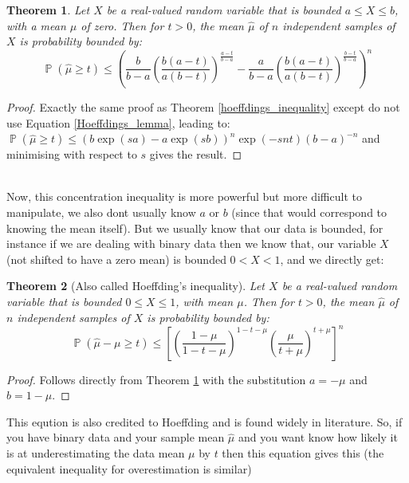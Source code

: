 \documentclass{article}
\newtheorem{theorem}{Theorem}
\DeclareMathOperator{\p}{\mathbb{P}}
\begin{document}
\begin{theorem}\label{hoeffdings_inequality22}
Let $X$ be a real-valued random variable that is bounded $a\le X\le b$, with a mean $\mu$ of zero.  Then for $t>0$, the mean $\hat{\mu}$ of $n$ independent samples of $X$ is probability bounded by:
\begin{equation}\p(\hat{\mu}\ge t)\le \left( \frac{b}{b-a}\left(\frac{b(a-t)}{a(b-t)}\right)^{\frac{a-t}{b-a}} -\frac{a}{b-a}\left(\frac{b(a-t)}{a(b-t)}\right)^{\frac{b-t}{b-a}}  \right)^n
\end{equation}
\end{theorem}
\begin{proof}
Exactly the same proof as Theorem \ref{hoeffdings_inequality} except do not use Equation \ref{Hoeffdings_lemma}, leading to:\\
$ \p(\hat{\mu}\ge t) \le (b\exp(sa) - a\exp(sb))^n\exp(-snt)(b-a)^{-n} $ and minimising with respect to $s$ gives the result.
\end{proof}
\-\hspace{1cm}\\
Now, this concentration inequality is more powerful but more difficult to manipulate, we also dont usually know $a$ or $b$ (since that would correspond to knowing the mean itself). But we usually know that our data is bounded, for instance if we are dealing with binary data then we know that, our variable $X$ (not shifted to have a zero mean) is bounded $0<X<1$, and we directly get:\\

\begin{theorem}[Also called Hoeffding's inequality]\label{hoeffdings_inequality23}
Let $X$ be a real-valued random variable that is bounded $0\le X\le 1$, with mean $\mu$. Then for $t>0$, the mean $\hat{\mu}$ of $n$ independent samples of $X$ is probability bounded by:
\begin{equation}\p(\hat{\mu}-\mu\ge t)\le \left[\left(\frac{1-\mu}{1-t-\mu}\right)^{1-t-\mu}  \left(\frac{\mu}{t+\mu}\right)^{t+\mu}\right]^n
\end{equation}
\end{theorem}
\begin{proof}Follows directly from Theorem \ref{hoeffdings_inequality22} with the substitution $a=-\mu$ and $b=1-\mu$.
\end{proof}

This eqution is also credited to Hoeffding and is found widely in literature.
So, if you have binary data and your sample mean $\hat{\mu}$ and you want know how likely it is at underestimating the data mean $\mu$ by $t$ then this equation gives this (the equivalent inequality for overestimation is similar)
\end{document}
